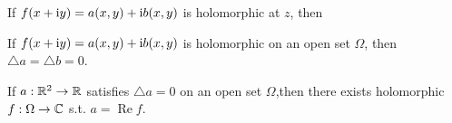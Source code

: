 \begin{theorem}[C-R equation]
    If $f(x+\mathrm{i} y)=a(x,y)+\mathrm{i} b(x,y)$ is holomorphic at $z$, then 
\end{theorem}

\begin{proposition}
    If $f(x+\mathrm{i} y)=a(x,y)+\mathrm{i} b(x,y)$ is holomorphic on an open set $\Omega$, then $\triangle a=\triangle b=0$.
\end{proposition}

\begin{proposition}
    If $a:\mathbb{R}^2\to\mathbb{R}$ satisfies $\triangle a=0$ on an open set $\Omega$,then there exists holomorphic $f:\Omega\to\mathbb{C}$ s.t. $a=\operatorname{Re}f$.
\end{proposition}